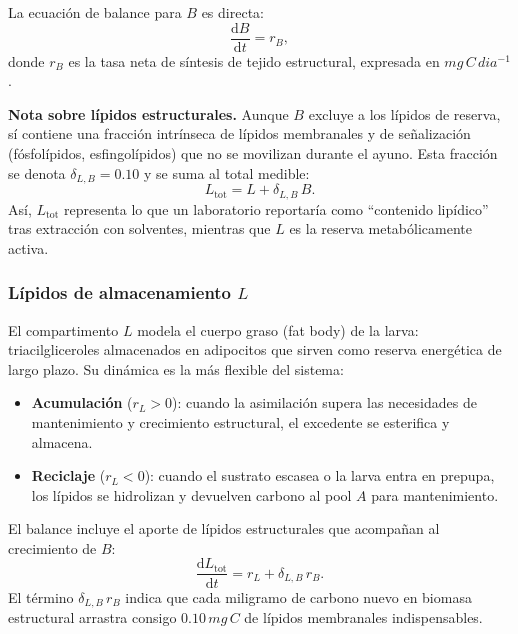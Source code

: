 La ecuación de balance para $B$ es directa:
\begin{equation}
    \frac{\mathrm{d}B}{\mathrm{d}t} = r_B,
    \label{eq:dB_dt}
\end{equation}
donde $r_B$ es la tasa neta de síntesis de tejido estructural, expresada en $\si{mg\,C\,dia^{-1}}$.

\textbf{Nota sobre lípidos estructurales.} Aunque $B$ excluye a los lípidos de reserva, sí contiene una fracción intrínseca de lípidos membranales y de señalización (fósfolípidos, esfingolípidos) que no se movilizan durante el ayuno. Esta fracción se denota $\delta_{L,B}=\num{0.10}$ y se suma al total medible:
\begin{equation}
    L_{\mathrm{tot}} = L + \delta_{L,B}\,B.
    \label{eq:L_tot}
\end{equation}
Así, $L_{\mathrm{tot}}$ representa lo que un laboratorio reportaría como ``contenido lipídico'' tras extracción con solventes, mientras que $L$ es la reserva metabólicamente activa.

\subsubsection{Lípidos de almacenamiento $L$}

El compartimento $L$ modela el cuerpo graso (fat body) de la larva: triacilgliceroles almacenados en adipocitos que sirven como reserva energética de largo plazo. Su dinámica es la más flexible del sistema:
\begin{itemize}
    \item \textbf{Acumulación} ($r_L > 0$): cuando la asimilación supera las necesidades de mantenimiento y crecimiento estructural, el excedente se esterifica y almacena.
    \item \textbf{Reciclaje} ($r_L < 0$): cuando el sustrato escasea o la larva entra en prepupa, los lípidos se hidrolizan y devuelven carbono al pool $A$ para mantenimiento.
\end{itemize}

El balance incluye el aporte de lípidos estructurales que acompañan al crecimiento de $B$:
\begin{equation}
    \frac{\mathrm{d}L_{\mathrm{tot}}}{\mathrm{d}t} = r_L + \delta_{L,B}\,r_B.
    \label{eq:dLtot_dt}
\end{equation}
El término $\delta_{L,B}\,r_B$ indica que cada miligramo de carbono nuevo en biomasa estructural arrastra consigo $\num{0.10}\,\si{mg\,C}$ de lípidos membranales indispensables.


